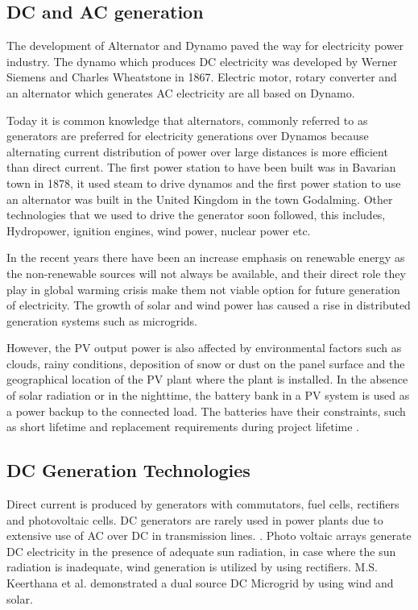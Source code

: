 \subsection{DC and AC generation}
The development of Alternator and Dynamo paved the way for electricity power industry. The dynamo which produces DC electricity was developed by Werner Siemens and Charles Wheatstone in 1867. Electric motor, rotary converter and an alternator which generates AC electricity are all based on Dynamo.\par
Today it is common knowledge that alternators, commonly referred to as generators are preferred for electricity generations over Dynamos because alternating current distribution of power over large distances is more efficient than direct current. The first power station to have been built was in Bavarian town in 1878, it used steam to drive dynamos and the first power station to use an alternator was built in the United Kingdom in the town Godalming. Other technologies that we used to drive the generator soon followed, this includes, Hydropower, ignition engines, wind power, nuclear power etc. \par
In the recent years there have been an increase emphasis on renewable energy as the non-renewable sources will not always be available, and their direct role they play in global warming crisis make them not viable option for future generation of electricity.  The growth of solar and wind power has caused a rise in distributed generation systems such as microgrids.\par
However, the PV output power is also affected by environmental factors such as clouds, rainy conditions, deposition of snow or dust on the panel surface and the geographical location of the PV plant where the plant is installed. In the absence of solar radiation or in the nighttime, the battery bank in a PV system is used as a power backup to the connected load. The batteries have their constraints, such as short lifetime and replacement requirements during project lifetime \cite{7}.\par
\subsection{DC Generation Technologies}
Direct current is produced by generators with commutators, fuel cells, rectifiers and photovoltaic cells. DC generators are rarely used in power plants due to extensive use of AC over DC in transmission lines. \cite{8}.  Photo voltaic arrays generate DC electricity in the presence of adequate sun radiation, in case where the sun radiation is inadequate, wind generation is utilized by using rectifiers.  M.S. Keerthana et al. \cite{9} demonstrated a dual source DC Microgrid by using wind and solar. \par
